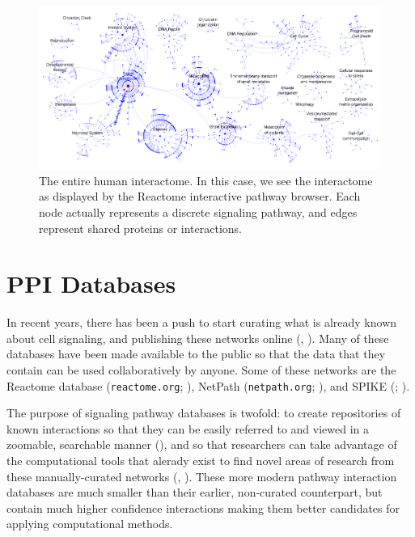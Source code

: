 \documentclass[12pt,twoside]{reedthesis}
\theoremstyle{definition}
\begin{document}
\begin{figure}[h]
  \begin{center}
    \includegraphics[width=\textwidth]{human_interactome}
  \caption[The entire human interactome.]{The entire human interactome. In this case, we see the interactome as displayed by the Reactome interactive pathway browser. Each node actually represents a discrete signaling pathway, and edges represent shared proteins or interactions.}
  \label{fig:human_interactome}
  \end{center}
\end{figure}

\section{PPI Databases}

In recent years, there has been a push to start curating what is already known about cell signaling, and publishing these networks online (\cite{Bauer-Mehren2009}, \cite{Cusick2009}). Many of these databases have been made available to the public so that the data that they contain can be used collaboratively by anyone. Some of these networks are the Reactome database (\texttt{reactome.org}; \cite{Matthews2009}), NetPath (\texttt{netpath.org}; \cite{Kandasamy2010}), and SPIKE (; \cite{Paz2011}).\par
The purpose of signaling pathway databases is twofold: to create repositories of known interactions so that they can be easily referred to and viewed in a zoomable, searchable manner (\cite{Hu2007}), and so that researchers can take advantage of the computational tools that alerady exist to find novel areas of research from these manually-curated networks (\cite{Karlebach2008}, \cite{Battle2010}). These more modern pathway interaction databases are much smaller than their earlier, non-curated counterpart, but contain much higher confidence interactions making them better candidates for applying computational methods.\par
\end{document}
